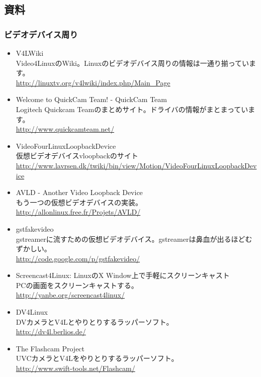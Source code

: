 \documentclass[mingoth,a4paper]{jsarticle}
\begin{document}
\subsection{資料}

\subsubsection{ビデオデバイス周り}

\begin{itemize}
 \item V4LWiki \\
Video4LinuxのWiki。Linuxのビデオデバイス周りの情報は一通り揃っています。 \\
\url{http://linuxtv.org/v4lwiki/index.php/Main_Page}

 \item Welcome to QuickCam Team! - QuickCam Team \\
 Logitech Quickcam Teamのまとめサイト。ドライバの情報がまとまっています。\\
\url{http://www.quickcamteam.net/}

 \item VideoFourLinuxLoopbackDevice \\
仮想ビデオデバイスvloopbackのサイト\\
\url{http://www.lavrsen.dk/twiki/bin/view/Motion/VideoFourLinuxLoopbackDevice}

 \item AVLD - Another Video Loopback Device \\
もう一つの仮想ビデオデバイスの実装。\\
\url{http://allonlinux.free.fr/Projets/AVLD/}

 \item gstfakevideo \\
gstreamerに流すための仮想ビデオデバイス。gstreamerは鼻血が出るほどむずかしい。\\
\url{http://code.google.com/p/gstfakevideo/}

 \item Screencast4Linux: LinuxのX Window上で手軽にスクリーンキャスト \\
PCの画面をスクリーンキャストする。\\
\url{http://yanbe.org/screencast4linux/}

 \item DV4Linux \\
DVカメラとV4Lとやりとりするラッパーソフト。\\
\url{http://dv4l.berlios.de/}

 \item The Flashcam Project \\
UVCカメラとV4Lをやりとりするラッパーソフト。\\
\url{http://www.swift-tools.net/Flashcam/}
\end{itemize}
\end{document}
